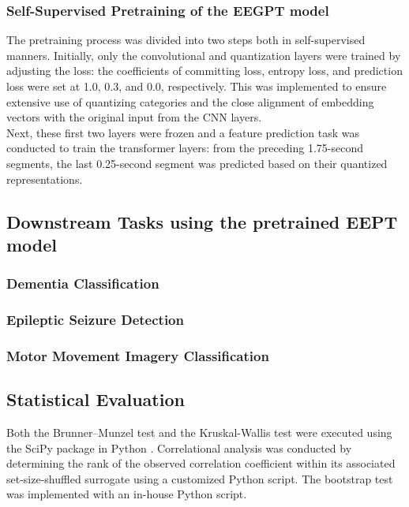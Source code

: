 
\subsubsection{Self-Supervised Pretraining of the EEGPT model}
The pretraining process was divided into two steps both in self-supervised manners. Initially, only the convolutional and quantization layers were trained by adjusting the loss: the coefficients of committing loss, entropy loss, and prediction loss were set at 1.0, 0.3, and 0.0, respectively. This was implemented to ensure extensive use of quantizing categories and the close alignment of embedding vectors with the original input from the CNN layers.
\\
\indent
Next, these first two layers were frozen and a feature prediction task was conducted to train the transformer layers: from the preceding 1.75-second segments, the last 0.25-second segment was predicted based on their quantized representations.

\subsection{Downstream Tasks using the pretrained EEPT model}
\subsubsection{Dementia Classification}

\subsubsection{Epileptic Seizure Detection}

\subsubsection{Motor Movement Imagery Classification}

\subsection{Statistical Evaluation}
Both the Brunner--Munzel test and the Kruskal-Wallis test were executed using the SciPy package in Python \cite{virtanen_scipy_2020}. Correlational analysis was conducted by determining the rank of the observed correlation coefficient within its associated set-size-shuffled surrogate using a customized Python script. The bootstrap test was implemented with an in-house Python script.
\label{sec:methods}